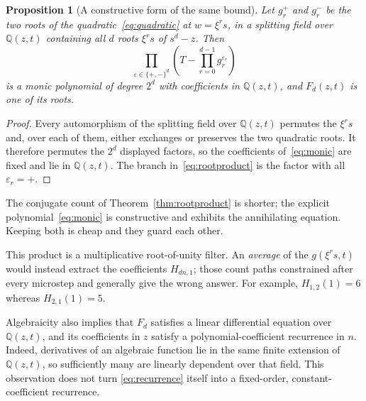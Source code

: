 \documentclass[11pt]{article}
\numberwithin{equation}{section}
\newtheorem{proposition}[theorem]{Proposition}
\theoremstyle{definition}
\newcommand{\Q}{\mathbb Q}
\begin{document}
\begin{proposition}[A constructive form of the same bound]
\label{prop:degree}
Let $g_r^+$ and $g_r^-$ be the two roots of the quadratic~\eqref{eq:quadratic}
at $w=\xi^rs$, in a splitting field over $\Q(z,t)$ containing all $d$ roots
$\xi^rs$ of $s^d-z$. Then
\begin{equation}
 \prod_{\varepsilon\in\{+,-\}^d}
   \left(T-\prod_{r=0}^{d-1}g_r^{\varepsilon_r}\right)
 \label{eq:monic}
\end{equation}
is a monic polynomial of degree $2^d$ with coefficients in $\Q(z,t)$, and
$F_d(z,t)$ is one of its roots.
\end{proposition}
\begin{proof}
Every automorphism of the splitting field over $\Q(z,t)$ permutes the $\xi^rs$
and, over each of them, either exchanges or preserves the two quadratic roots.
It therefore permutes the $2^d$ displayed factors, so the coefficients
of~\eqref{eq:monic} are fixed and lie in $\Q(z,t)$. The branch
in~\eqref{eq:rootproduct} is the factor with all $\varepsilon_r=+$.
\end{proof}

The conjugate count of Theorem~\ref{thm:rootproduct} is shorter; the explicit
polynomial~\eqref{eq:monic} is constructive and exhibits the annihilating
equation. Keeping both is cheap and they guard each other.

This product is a multiplicative root-of-unity filter. An \emph{average} of
the $g(\xi^rs,t)$ would instead extract the coefficients $H_{dn,1}$; those
count paths constrained after every microstep and generally give the wrong
answer. For example, $H_{1,2}(1)=6$ whereas $H_{2,1}(1)=5$.

Algebraicity also implies that $F_d$ satisfies a linear differential equation
over $\Q(z,t)$, and its coefficients in $z$ satisfy a polynomial-coefficient
recurrence in $n$. Indeed, derivatives of an algebraic function lie in the
same finite extension of $\Q(z,t)$, so sufficiently many are linearly
dependent over that field. This observation does not turn
\eqref{eq:recurrence} itself into a fixed-order, constant-coefficient recurrence.
\end{document}
